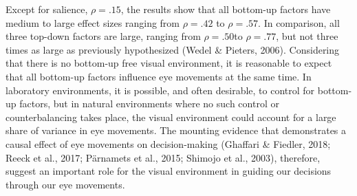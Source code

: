 \documentclass{article}
\begin{document}



Except for salience, $\rho = .15$, the results show that all bottom-up factors have medium to large effect sizes ranging from $\rho = .42$ to $\rho = .57$. In comparison, all three top-down factors are large, ranging from $\rho = .50$to $\rho = .77$, but not three times as large as previously hypothesized (Wedel \& Pieters, 2006). Considering that there is no bottom-up free visual environment, it is reasonable to expect that all bottom-up factors influence eye movements at the same time. In laboratory environments, it is possible, and often desirable, to control for bottom-up factors, but in natural environments where no such control or counterbalancing takes place, the visual environment could account for a large share of variance in eye movements. The mounting evidence that demonstrates a causal effect of eye movements on decision-making (Ghaffari \& Fiedler, 2018; Reeck et al., 2017; Pärnamets et al., 2015; Shimojo et al., 2003), therefore, suggest an important role for the visual environment in guiding our decisions through our eye movements. 
\end{document}
